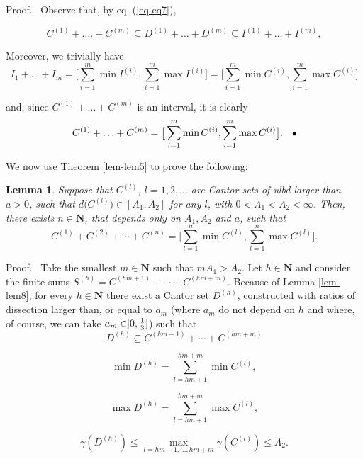 \documentclass[final,epsfig,amsfont]{article}
\newtheorem{lemma}[theorem]{Lemma}
\begin{document}
{\smallskip Proof.\ } Observe that, by eq. (\ref{eq-eq7}),

$$C^{(1)}+\ldots.+C^{(m)}\subseteq D^{(1)}+\ldots+D^{(m)}\subseteq I^{(1)}+\ldots+I^{(m)},$$

Moreover, we trivially have
$$I_1+\ldots+I_m=\big[\sum\limits_{i=1}^m \min I^{(i)}, \sum\limits_{i=1}^m \max
I^{(i)}\big]= \big[\sum\limits_{i=1}^m \min C^{(i)}, \sum\limits_{i=1}^m \max C^{(i)}\big]$$

and, since $C^{(1)}+\ldots+C^{(m)}$ is an interval, it is clearly
$$C^{(1)}+\ldots+C^{(m)}=\big[\sum\limits_{i=1}^m \min C^{(i)}, \sum\limits_{i=1}^m \max
C^{(i)}\big].  {\quad \vrule height .9ex width .8ex depth -.1ex}$$

We now use Theorem \ref{lem-lem5} to prove the following:

\begin{lemma}
\label{lem-lem9}
Suppose that $C^{(l)}$, $l=1,2,\ldots$ are Cantor sets of ulbd larger than $a>0$, such that
$d\big(C^{(l)}\big)\in [A_1,A_2]$ for any $l$, with  $0<A_1< A_2<\infty$. Then, there exists $n \in {\mathbf N}$, that depends only on $A_1,A_2$ and $a$, such that
$$C^{(1)}+ C^{(2)}+\cdots+C^{(n)}=
\Big[\sum\limits_{l=1}^n \min C^{(l)}, \sum\limits_{l=1}^n \max C^{(l)}\Big].$$
\end{lemma}

{\smallskip Proof.\ } Take the smallest $m \in {\mathbf N}$ such that  $mA_1>A_2$. Let $h \in {\mathbf N}$ and consider the finite sums $S^{(h)}= C^{(hm+1)}+\cdots+ C^{(hm+m)}$. Because of
Lemma \ref{lem-lem8}, for every $h\in{\mathbf N}$
there exist a Cantor set $D^{(h)}$, constructed with ratios of dissection larger than, or equal to $a_m$ (where $a_m$ do not depend on $h$ and where, of course, we can take $a_m\in ]0,{1\over 3}]$) such that
\begin{equation}
\label{eq-eq36}
  D^{(h)}\subseteq C^{(hm+1)}+\cdots+ C^{(hm+m)}
\end{equation}

\begin{equation}
\label{eq-eq37}
 \min D^{(h)}=\sum\limits_{l=hm+1}^{hm+m} \min C^{(l)},
\end{equation}

\begin{equation}
\label{eq-eq38}
 \max D^{(h)}=\sum\limits_{l=hm+1}^{hm+m} \max C^{(l)},
\end{equation}

\begin{equation}
\label{eq-eq39}
 \gamma(D^{(h)})\le\max\limits_{l=hm+1,\ldots,hm+m} \gamma(C^{(l)})\le A_2.
\end{equation}
\end{document}
